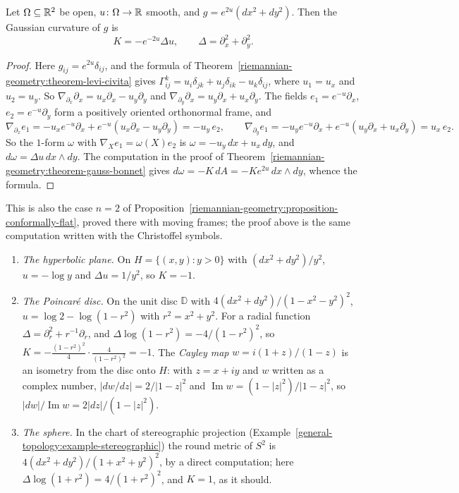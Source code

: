 \begin{proposition}\label{riemannian-geometry:proposition-conformal-curvature}
Let $\Omega \subseteq \mathbb{R}^2$ be open, $u \colon \Omega \to \mathbb{R}$ smooth, and $g = e^{2u}(dx^2 + dy^2)$. Then the Gaussian curvature of $g$ is
\[
K = -e^{-2u}\Delta u, \qquad \Delta = \partial_x^2 + \partial_y^2 .
\]
\end{proposition}

\begin{proof}
Here $g_{ij} = e^{2u}\delta_{ij}$, and the formula of Theorem~\ref{riemannian-geometry:theorem-levi-civita} gives
$\Gamma^k_{ij} = u_i\delta_{jk} + u_j\delta_{ik} - u_k\delta_{ij}$, where $u_1 = u_x$ and $u_2 = u_y$. So $\nabla_{\partial_x}\partial_x = u_x\partial_x - u_y\partial_y$ and
$\nabla_{\partial_y}\partial_x = u_y\partial_x + u_x\partial_y$. The fields $e_1 = e^{-u}\partial_x$, $e_2 = e^{-u}\partial_y$ form a positively oriented orthonormal frame, and
\[
\nabla_{\partial_x}e_1 = -u_xe^{-u}\partial_x + e^{-u}(u_x\partial_x - u_y\partial_y) = -u_y\,e_2, \qquad
\nabla_{\partial_y}e_1 = -u_ye^{-u}\partial_x + e^{-u}(u_y\partial_x + u_x\partial_y) = u_x\,e_2 .
\]
So the $1$-form $\omega$ with $\nabla_Xe_1 = \omega(X)e_2$ is $\omega = -u_y\,dx + u_x\,dy$, and $d\omega = \Delta u\,dx \wedge dy$. The computation in the proof of
Theorem~\ref{riemannian-geometry:theorem-gauss-bonnet} gives $d\omega = -K\,dA = -Ke^{2u}\,dx \wedge dy$, whence the formula.
\end{proof}

This is also the case $n = 2$ of Proposition~\ref{riemannian-geometry:proposition-conformally-flat}, proved there with moving frames; the proof above is the same computation written with the
Christoffel symbols.

\begin{example}\label{riemannian-geometry:example-conformal-metrics}
\begin{enumerate}
\item \emph{The hyperbolic plane.} On $H = \{(x, y) : y > 0\}$ with $(dx^2 + dy^2)/y^2$, $u = -\log y$ and $\Delta u = 1/y^2$, so $K = -1$.
\item \emph{The Poincar\'e disc.} On the unit disc $\mathbb{D}$ with $4(dx^2 + dy^2)/(1 - x^2 - y^2)^2$, $u = \log2 - \log(1 - r^2)$ with $r^2 = x^2 + y^2$. For a radial function
$\Delta = \partial_r^2 + r^{-1}\partial_r$, and $\Delta\log(1 - r^2) = -4/(1 - r^2)^2$, so $K = -\frac{(1 - r^2)^2}4 \cdot \frac4{(1 - r^2)^2} = -1$. The \emph{Cayley map}
$w = i(1 + z)/(1 - z)$ is an isometry from the disc onto $H$: with $z = x + iy$ and $w$ written as a complex number, $|dw/dz| = 2/|1 - z|^2$ and
$\operatorname{Im}w = (1 - |z|^2)/|1 - z|^2$, so $|dw|/\operatorname{Im}w = 2|dz|/(1 - |z|^2)$.
\item \emph{The sphere.} In the chart of stereographic projection (Example~\ref{general-topology:example-stereographic}) the round metric of $S^2$ is
$4(dx^2 + dy^2)/(1 + x^2 + y^2)^2$, by a direct computation; here $\Delta\log(1 + r^2) = 4/(1 + r^2)^2$, and $K = 1$, as it should.
\end{enumerate}
\end{example}

